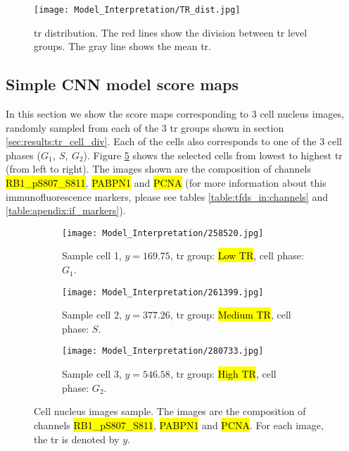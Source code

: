 \begin{figure}[htb]
  \centering
  \texttt{[image: Model\_Interpretation/TR\_dist.jpg]}
  \caption{\gls{tr} distribution. The red lines show the division between \gls{tr} level groups. The gray line shows the mean \gls{tr}.}
  \label{fig:results:model_int:tr_dist}
\end{figure}

\subsection{Simple CNN model score maps}

In this section we show the score maps corresponding to 3 cell nucleus images, randomly sampled from each of the 3 \gls{tr} groups shown in section \ref{sec:results:tr_cell_div}. Each of the cells also corresponds to one of the 3 cell phases ($G_1,\ S,\ G_2$). Figure \ref{fig:results:model_inter_cell_samp} shows the selected cells from lowest to highest \gls{tr} (from left to right).
The images shown are the composition of channels \hl{RB1\_pS807\_S811}, \hl{PABPN1} and \hl{PCNA} (for more information about this immunofluorescence markers, please see tables \ref{table:tfds_in:channels} and \ref{table:apendix:if_markers}).

\begin{figure}[!ht]
  \centering
  \begin{subfigure}[b]{.3\linewidth}
    \texttt{[image: Model\_Interpretation/258520.jpg]}
    \caption{Sample cell 1, $y=169.75$, \gls{tr} group: \hl{Low TR}, cell phase: $G_1$.}
    \label{fig:results:model_inter_cell_samp:cell_1}
  \end{subfigure}
  \begin{subfigure}[b]{.3\linewidth}
    \texttt{[image: Model\_Interpretation/261399.jpg]}
    \caption{Sample cell 2, $y=377.26$, \gls{tr} group: \hl{Medium TR}, cell phase: $S$.}
    \label{fig:results:model_inter_cell_samp:cell_2}
  \end{subfigure}
  \begin{subfigure}[b]{.3\linewidth}
    \texttt{[image: Model\_Interpretation/280733.jpg]}
    \caption{Sample cell 3, $y=546.58$, \gls{tr} group: \hl{High TR}, cell phase: $G_2$.}
    \label{fig:results:model_inter_cell_samp:cell_3}
  \end{subfigure}
  \caption{Cell nucleus images sample. The images are the composition of channels \hl{RB1\_pS807\_S811}, \hl{PABPN1} and \hl{PCNA}. For each image, the \gls{tr} is denoted by $y$.}
  \label{fig:results:model_inter_cell_samp}
\end{figure}

